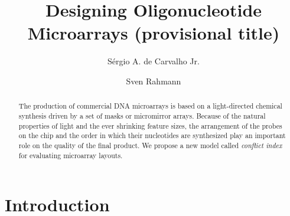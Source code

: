 \documentclass[runningheads]{llncs}
\begin{document}
\title{Designing Oligonucleotide Microarrays (provisional title)}
%
%
\author{S\'ergio A. de Carvalho Jr. \and Sven Rahmann}
%
%
%

\maketitle

\begin{abstract}
The production of commercial DNA microarrays is based on a
light-directed chemical synthesis driven by a set of masks or
micromirror arrays. Because of the natural properties of light and the
ever shrinking feature sizes, the arrangement of the probes on the
chip and the order in which their nucleotides are synthesized play an
important role on the quality of the final product. We propose a new
model called \emph{conflict index} for evaluating microarray layouts.
\end{abstract}

\section{Introduction}
\label{sec:intro}
\end{document}
